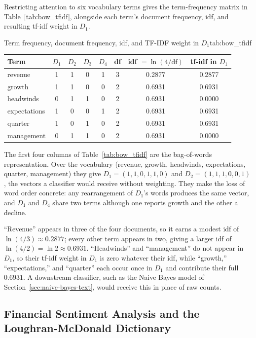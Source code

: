 \documentclass[../ai_in_finance]{subfiles}
\begin{document}
Restricting attention to six vocabulary terms gives the term-frequency matrix in Table~\ref{tab:bow_tfidf}, alongside each term's document frequency, idf, and resulting tf-idf weight in $D_1$.

\begin{booktable}[htbp]{Term frequency, document frequency, idf, and TF-IDF weight in $D_1$}{tab:bow_tfidf}
\begin{tabular}{lccccccc}
\toprule
Term & $D_1$ & $D_2$ & $D_3$ & $D_4$ & df & idf $=\ln(4/\text{df})$ & tf-idf in $D_1$ \\
\midrule
revenue & 1 & 1 & 0 & 1 & 3 & 0.2877 & 0.2877 \\
growth & 1 & 1 & 0 & 0 & 2 & 0.6931 & 0.6931 \\
headwinds & 0 & 1 & 1 & 0 & 2 & 0.6931 & 0.0000 \\
expectations & 1 & 0 & 0 & 1 & 2 & 0.6931 & 0.6931 \\
quarter & 1 & 0 & 1 & 0 & 2 & 0.6931 & 0.6931 \\
management & 0 & 1 & 1 & 0 & 2 & 0.6931 & 0.0000 \\
\bottomrule
\end{tabular}
\end{booktable}

The first four columns of Table~\ref{tab:bow_tfidf} are the bag-of-words representation. Over the vocabulary (revenue, growth, headwinds, expectations, quarter, management) they give $D_1 = (1,1,0,1,1,0)$ and $D_2 = (1,1,1,0,0,1)$, the vectors a classifier would receive without weighting. They make the loss of word order concrete: any rearrangement of $D_1$'s words produces the same vector, and $D_1$ and $D_4$ share two terms although one reports growth and the other a decline.

``Revenue'' appears in three of the four documents, so it earns a modest idf of $\ln(4/3) \approx 0.2877$; every other term appears in two, giving a larger idf of $\ln(4/2) = \ln 2 \approx 0.6931$. ``Headwinds'' and ``management'' do not appear in $D_1$, so their tf-idf weight in $D_1$ is zero whatever their idf, while ``growth,'' ``expectations,'' and ``quarter'' each occur once in $D_1$ and contribute their full $0.6931$. A downstream classifier, such as the Naive Bayes model of Section~\ref{sec:naive-bayes-text}, would receive this in place of raw counts.

\subsection{Financial Sentiment Analysis and the Loughran-McDonald Dictionary}
\label{sec:sentiment}
\end{document}
